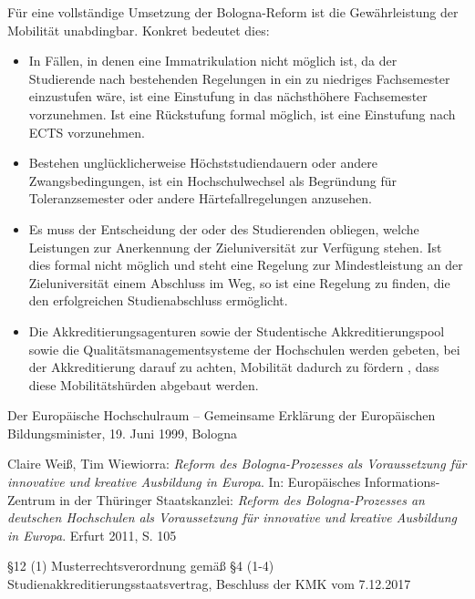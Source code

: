 Für eine vollständige Umsetzung der Bologna-Reform ist die Gewährleistung der
Mobilität unabdingbar. Konkret bedeutet dies:
\begin{itemize}

\item In Fällen, in denen eine Immatrikulation nicht möglich ist, da der Studierende
  nach bestehenden Regelungen in ein zu niedriges Fachsemester einzustufen wäre,
  ist eine Einstufung in das nächsthöhere Fachsemester vorzunehmen. Ist eine
  Rückstufung formal möglich, ist eine Einstufung nach ECTS vorzunehmen.
\item Bestehen unglücklicherweise Höchststudiendauern oder andere Zwangsbedingungen,
  ist ein Hochschulwechsel als Begründung für Toleranzsemester oder andere
  Härtefallregelungen anzusehen.
\item Es muss der Entscheidung der oder des Studierenden obliegen, welche Leistungen
  zur Anerkennung der Zieluniversität zur Verfügung stehen. Ist dies formal
  nicht möglich und steht eine Regelung zur Mindestleistung an der
  Zieluniversität einem Abschluss im Weg, so ist eine Regelung zu finden, die
  den erfolgreichen Studienabschluss ermöglicht.
\item Die Akkreditierungsagenturen sowie der Studentische Akkreditierungspool sowie die Qualitätsmanagementsysteme der Hochschulen werden
  gebeten, bei der Akkreditierung darauf zu achten, Mobilität dadurch zu
  fördern \cite{mrvo}, dass diese Mobilitätshürden abgebaut werden.
 \end{itemize}

\begin{thebibliography}{9}
 Der Europäische Hochschulraum – Gemeinsame Erklärung der Europäischen Bildungsminister, 19. Juni 1999, Bologna

  Claire Weiß, Tim Wiewiorra: \textit{Reform des Bologna-Prozesses als Voraussetzung
    für innovative und kreative Ausbildung in Europa}. In: Europäisches
    Informations-Zentrum in der Thüringer Staatskanzlei:
    \textit{Reform des Bologna-Prozesses an deutschen Hochschulen als Voraussetzung für
    innovative und kreative Ausbildung in Europa}. Erfurt 2011, S. 105

 §12 (1) Musterrechtsverordnung gemäß §4 (1-4)
  Studienakkreditierungsstaatsvertrag, Beschluss der KMK vom 7.12.2017
\end{thebibliography}

